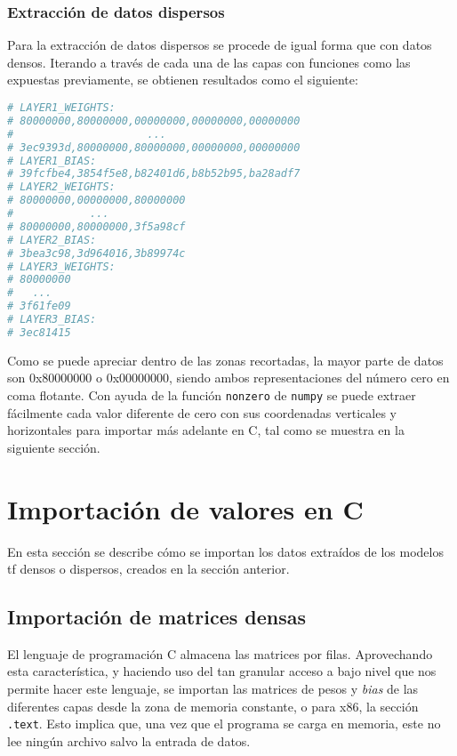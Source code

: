 \subsubsection{Extracción de datos dispersos}
\label{sssec:extraccion_datos_dispersos}
Para la extracción de datos dispersos se procede de igual forma que con datos densos. Iterando a través de cada una de las capas con funciones como las expuestas previamente, se obtienen resultados como el siguiente:\medskip
\begin{lstlisting}[language=Python]
# LAYER1_WEIGHTS:
# 80000000,80000000,00000000,00000000,00000000
#                     ...
# 3ec9393d,80000000,80000000,00000000,00000000
# LAYER1_BIAS:
# 39fcfbe4,3854f5e8,b82401d6,b8b52b95,ba28adf7
# LAYER2_WEIGHTS:
# 80000000,00000000,80000000
#            ...
# 80000000,80000000,3f5a98cf
# LAYER2_BIAS:
# 3bea3c98,3d964016,3b89974c
# LAYER3_WEIGHTS:
# 80000000
#   ...
# 3f61fe09
# LAYER3_BIAS:
# 3ec81415    
\end{lstlisting}

Como se puede apreciar dentro de las zonas recortadas, la mayor parte de datos son 0x80000000 o 0x00000000, siendo ambos representaciones del número cero en coma flotante. Con ayuda de la función \texttt{nonzero} de \texttt{numpy} se puede extraer fácilmente cada valor diferente de cero con sus coordenadas verticales y horizontales para importar más adelante en C, tal como se muestra en la siguiente sección.

\section{Importación de valores en C}
\label{sec:importacion_valores_c}
En esta sección se describe cómo se importan los datos extraídos de los modelos \acrlong{tf} densos o dispersos, creados en la sección anterior.

\subsection{Importación de matrices densas}
\label{ssec:importacion_matrices_densas}
El lenguaje de programación C almacena las matrices por filas. Aprovechando esta característica, y haciendo uso del tan granular acceso a bajo nivel que nos permite hacer este lenguaje, se importan las matrices de pesos y \textit{bias} de las diferentes capas desde la zona de memoria constante, o para x86, la sección \texttt{.text}. Esto implica que, una vez que el programa se carga en memoria, este no lee ningún archivo salvo la entrada de datos.

